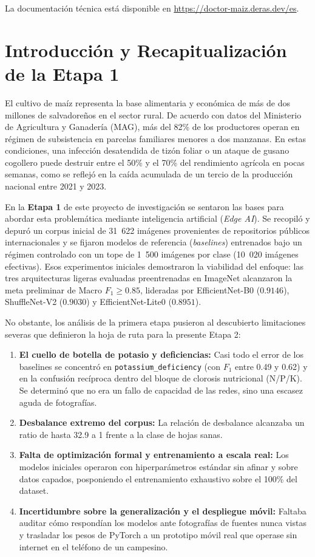 \documentclass[12pt,letterpaper]{article}
\begin{document}
\noindent La documentaci\'on t\'ecnica est\'a disponible en \url{https://doctor-maiz.deras.dev/es}.

\newpage

\section{Introducci\'on y Recapitualizaci\'on de la Etapa 1}

El cultivo de ma\'iz representa la base alimentaria y econ\'omica de m\'as de dos millones de salvadore\~nos en el sector rural. De acuerdo con datos del Ministerio de Agricultura y Ganader\'ia (MAG), m\'as del 82\% de los productores operan en r\'egimen de subsistencia en parcelas familiares menores a dos manzanas. En estas condiciones, una infecci\'on desatendida de tiz\'on foliar o un ataque de gusano cogollero puede destruir entre el 50\% y el 70\% del rendimiento agr\'icola en pocas semanas, como se reflej\'o en la ca\'ida acumulada de un tercio de la producci\'on nacional entre 2021 y 2023.

En la \textbf{Etapa 1} de este proyecto de investigaci\'on se sentaron las bases para abordar esta problem\'atica mediante inteligencia artificial (\textit{Edge AI}). Se recopil\'o y depur\'o un corpus inicial de 31~622 im\'agenes provenientes de repositorios p\'ublicos internacionales y se fijaron modelos de referencia (\textit{baselines}) entrenados bajo un r\'egimen controlado con un tope de 1~500 im\'agenes por clase (10~020 im\'agenes efectivas). Esos experimentos iniciales demostraron la viabilidad del enfoque: las tres arquitecturas ligeras evaluadas preentrenadas en ImageNet alcanzaron la meta preliminar de Macro $F_1 \geq 0.85$, lideradas por EfficientNet-B0 ($0.9146$), ShuffleNet-V2 ($0.9030$) y EfficientNet-Lite0 ($0.8951$).

No obstante, los an\'alisis de la primera etapa pusieron al descubierto limitaciones severas que definieron la hoja de ruta para la presente Etapa 2:
\begin{enumerate}
\item \textbf{El cuello de botella de potasio y deficiencias:} Casi todo el error de los baselines se concentr\'o en \texttt{potassium\_deficiency} (con $F_1$ entre 0.49 y 0.62) y en la confusi\'on rec\'iproca dentro del bloque de clorosis nutricional (N/P/K). Se determin\'o que no era un fallo de capacidad de las redes, sino una escasez aguda de fotograf\'ias.
\item \textbf{Desbalance extremo del corpus:} La relaci\'on de desbalance alcanzaba un ratio de hasta 32.9 a 1 frente a la clase de hojas sanas.
\item \textbf{Falta de optimizaci\'on formal y entrenamiento a escala real:} Los modelos iniciales operaron con hiperpar\'ametros est\'andar sin afinar y sobre datos capados, posponiendo el entrenamiento exhaustivo sobre el 100\% del dataset.
\item \textbf{Incertidumbre sobre la generalizaci\'on y el despliegue m\'ovil:} Faltaba auditar c\'omo respond\'ian los modelos ante fotograf\'ias de fuentes nunca vistas y trasladar los pesos de PyTorch a un prototipo m\'ovil real que operase sin internet en el tel\'efono de un campesino.
\end{enumerate}
\end{document}
